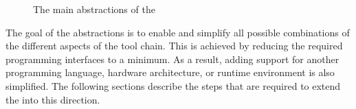 \begin{figure}
\caption{The main abstractions of the \ecs{}}
\label{fig:extabstractions}
\end{figure}

The goal of the abstractions is to enable and simplify all possible combinations of the different aspects of the tool chain.
This is achieved by reducing the required programming interfaces to a minimum.
As a result, adding support for another programming language, hardware architecture, or runtime environment is also simplified.
The following sections describe the steps that are required to extend the \ecs{} into this direction.

